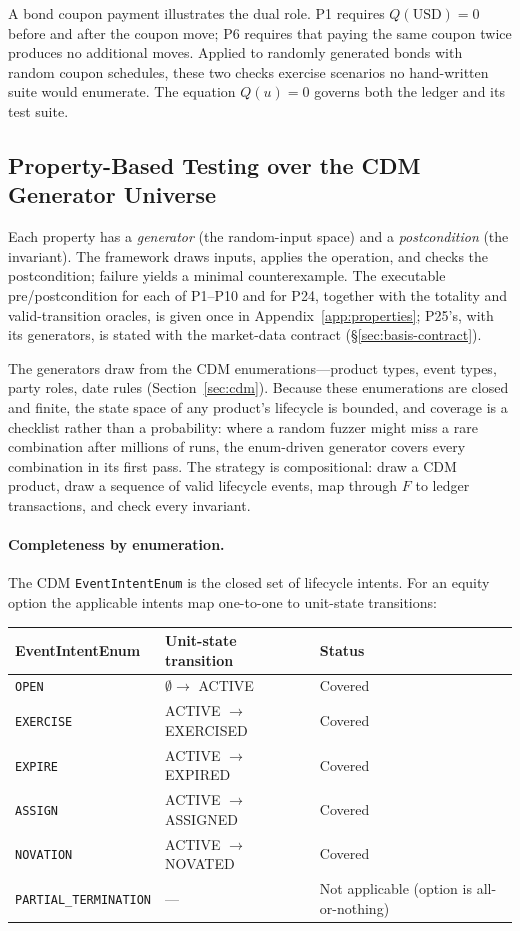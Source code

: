 \documentclass[11pt,a4paper]{article}
\begin{document}
A bond coupon payment illustrates the dual role. P1 requires $Q(\mathrm{USD})=0$ before and after the coupon move; P6 requires that paying the same coupon twice produces no additional moves. Applied to randomly generated bonds with random coupon schedules, these two checks exercise scenarios no hand-written suite would enumerate. The equation $Q(u)=0$ governs both the ledger and its test suite.

\subsection{Property-Based Testing over the CDM Generator Universe}
\label{sec:invariants-pbt}

Each property has a \emph{generator} (the random-input space) and a \emph{postcondition} (the invariant). The framework draws inputs, applies the operation, and checks the postcondition; failure yields a minimal counterexample. The executable pre/postcondition for each of P1--P10 and for P24, together with the totality and valid-transition oracles, is given once in Appendix~\ref{app:properties}; P25's, with its generators, is stated with the market-data contract (\S\ref{sec:basis-contract}).

The generators draw from the CDM enumerations---product types, event types, party roles, date rules (Section~\ref{sec:cdm}). Because these enumerations are closed and finite, the state space of any product's lifecycle is bounded, and coverage is a checklist rather than a probability: where a random fuzzer might miss a rare combination after millions of runs, the enum-driven generator covers every combination in its first pass. The strategy is compositional: draw a CDM product, draw a sequence of valid lifecycle events, map through $F$ to ledger transactions, and check every invariant.

\paragraph{Completeness by enumeration.} The CDM \texttt{EventIntentEnum} is the closed set of lifecycle intents. For an equity option the applicable intents map one-to-one to unit-state transitions:

\begin{center}
\begin{tabular}{lll}
\toprule
\textbf{EventIntentEnum} & \textbf{Unit-state transition} & \textbf{Status} \\
\midrule
\texttt{OPEN} & $\emptyset\to$ ACTIVE & Covered \\
\texttt{EXERCISE} & ACTIVE $\to$ EXERCISED & Covered \\
\texttt{EXPIRE} & ACTIVE $\to$ EXPIRED & Covered \\
\texttt{ASSIGN} & ACTIVE $\to$ ASSIGNED & Covered \\
\texttt{NOVATION} & ACTIVE $\to$ NOVATED & Covered \\
\texttt{PARTIAL\_TERMINATION} & --- & Not applicable (option is all-or-nothing) \\
\bottomrule
\end{tabular}
\end{center}
\end{document}
